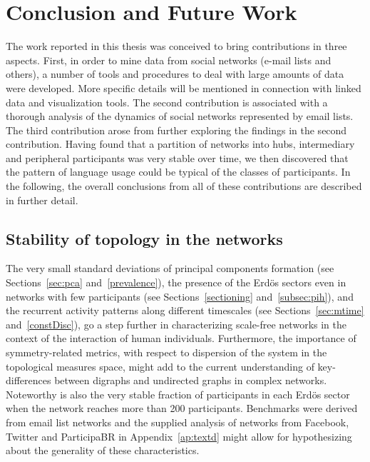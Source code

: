 \chapter{Conclusion and Future Work}
\label{ch:concl}
The work reported in this thesis was conceived to bring contributions in three aspects. First, in order to mine data from social networks (e-mail lists and others), a number of tools and procedures to deal with large amounts of data were developed. More specific details will be mentioned in connection with linked data and visualization tools. The second contribution is associated with a thorough analysis of the dynamics of social networks represented by email lists. The third contribution arose from further exploring the findings in the second contribution. Having found that a partition of networks into hubs, intermediary and peripheral participants was very stable over time, we then discovered that the pattern of language usage could be typical of the classes of participants. In the following, the overall conclusions from all of these contributions are described in further detail. 

\section{Stability of topology in the networks}

The very small standard deviations of principal components formation
(see Sections~\ref{sec:pca} and~\ref{prevalence}),
the presence of the Erd\"os sectors even in networks with
few participants (see Sections~\ref{sectioning} and~\ref{subsec:pih}),
and the recurrent activity patterns along different timescales (see Sections~\ref{sec:mtime} and~\ref{constDisc}),
go a step further in characterizing scale-free networks in the context
of the interaction of human individuals.
Furthermore, the importance of symmetry-related metrics,
with respect to dispersion of the system in the topological measures space,
might add to the current understanding of key-differences between digraphs and
undirected graphs in complex networks.
Noteworthy is also the very stable fraction of participants in each Erd\"os sector when the network reaches more than 200 participants.
Benchmarks were derived from email list networks
and the supplied analysis of
networks from Facebook,
Twitter and ParticipaBR in Appendix~\ref{ap:textd} might allow for hypothesizing
about the generality of these characteristics.

